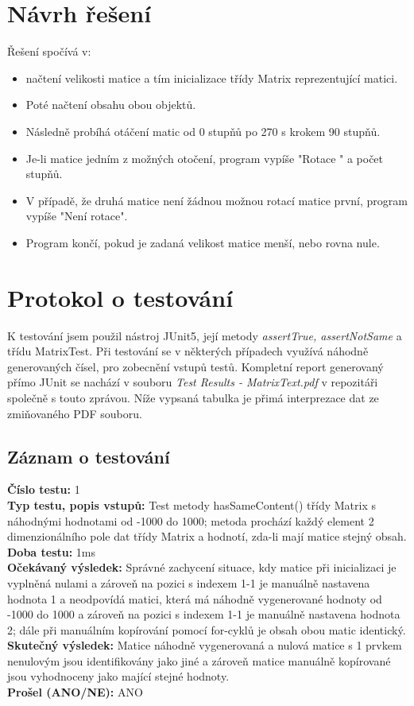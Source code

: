 \documentclass[a4paper,12pt]{article}
\begin{document}
\section{Návrh řešení}
     Řešení spočívá v:
     \begin{itemize}
          \item načtení velikosti matice a tím inicializace třídy Matrix reprezentující matici.
          \item Poté načtení obsahu obou objektů.
          \item Následně probíhá otáčení matic od 0 stupňů po 270 s krokem 90 stupňů.
          \item Je-li matice jedním z možných otočení, program vypíše "Rotace " a počet stupňů.
          \item V případě, že druhá matice není žádnou možnou rotací matice první, program vypíše "Není rotace".
          \item Program končí, pokud je zadaná velikost matice menší, nebo rovna nule.
     \end{itemize}

\section{Protokol o testování}
     K testování jsem použil nástroj JUnit5, její metody \textit{assertTrue, assertNotSame} a třídu MatrixTest.
     Při testování se v některých případech využívá náhodně generovaných čísel, pro zobecnění vstupů testů.
     Kompletní report generovaný přímo JUnit se nachází v souboru \textit{Test Results - MatrixText.pdf} v repozitáři
     společně s touto zprávou. Níže vypsaná tabulka je přimá interprezace dat ze zmiňovaného PDF souboru.

\subsection{Záznam o testování}

     \textbf{Číslo testu:} 1\\
     \textbf{Typ testu, popis vstupů:} Test metody hasSameContent() třídy Matrix s náhodnými hodnotami od -1000 do 1000;
     metoda prochází každý element 2 dimenzionálního pole dat třídy Matrix a hodnotí, zda-li mají matice stejný obsah.\\
     \textbf{Doba testu:} 1ms \\
     \textbf{Očekávaný výsledek:} Správné zachycení situace, kdy matice při inicializaci je vyplněná nulami a zároveň
     na pozici s indexem 1-1 je manuálně nastavena hodnota 1 a neodpovídá
     matici, která má náhodně vygenerované hodnoty od -1000 do 1000 a zároveň na pozici s indexem 1-1 je manuálně
     nastavena hodnota 2; dále při manuálním kopírování pomocí for-cyklů je obsah obou matic identický.\\
     \textbf{Skutečný výsledek:} Matice náhodně vygenerovaná a nulová matice s 1 prvkem nenulovým jsou identifikovány
     jako jiné a zároveň matice manuálně kopírované jsou vyhodnoceny jako mající stejné hodnoty.\\
     \textbf{Prošel (ANO/NE):} ANO\\
\end{document}
